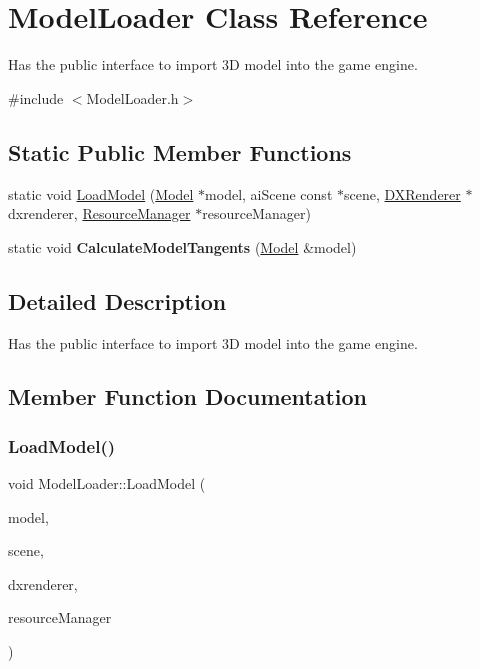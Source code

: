 \hypertarget{classModelLoader}{}\section{Model\+Loader Class Reference}
\label{classModelLoader}


Has the public interface to import 3D model into the game engine.  




{\ttfamily \#include $<$Model\+Loader.\+h$>$}

\subsection*{Static Public Member Functions}
\begin{DoxyCompactItemize}
\item 
static void \hyperlink{classModelLoader_af286ff6c28ac0e7de71dcc4572779ed0}{Load\+Model} (\hyperlink{classModel}{Model} $\ast$model, ai\+Scene const $\ast$scene, \hyperlink{classDXRenderer}{D\+X\+Renderer} $\ast$dxrenderer, \hyperlink{classResourceManager}{Resource\+Manager} $\ast$resource\+Manager)
\item 
\mbox{\label{classModelLoader_aa7d14780f5e86d6ffae9ee2771a822f3}} 
static void {\bfseries Calculate\+Model\+Tangents} (\hyperlink{classModel}{Model} \&model)
\end{DoxyCompactItemize}


\subsection{Detailed Description}
Has the public interface to import 3D model into the game engine. 

\subsection{Member Function Documentation}
\mbox{\label{classModelLoader_af286ff6c28ac0e7de71dcc4572779ed0}} 
\subsubsection{\texorpdfstring{Load\+Model()}{LoadModel()}}
{\footnotesize\ttfamily void Model\+Loader\+::\+Load\+Model (\begin{DoxyParamCaption}\item[{\hyperlink{classModel}{Model} $\ast$}]{model,  }\item[{ai\+Scene const $\ast$}]{scene,  }\item[{\hyperlink{classDXRenderer}{D\+X\+Renderer} $\ast$}]{dxrenderer,  }\item[{\hyperlink{classResourceManager}{Resource\+Manager} $\ast$}]{resource\+Manager }\end{DoxyParamCaption})\hspace{0.3cm}{\ttfamily [static]}}


